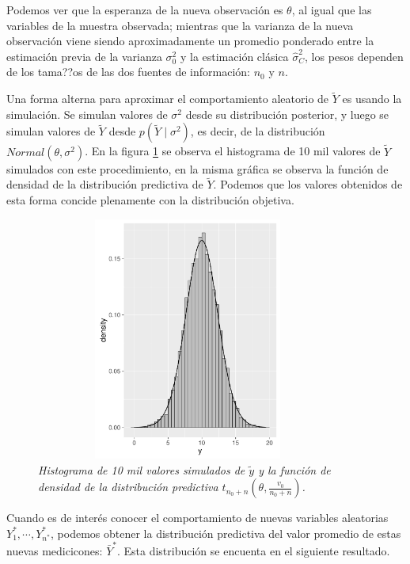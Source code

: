     Podemos ver que la esperanza de la nueva observaci\'on es $\theta$, al igual que las variables de la muestra observada; mientras que la varianza de la nueva observaci\'on viene siendo aproximadamente un promedio ponderado entre la estimaci\'on previa de la varianza $\sigma^2_0$ y la estimaci\'on cl\'asica $\hat{\sigma}^2_C$, los pesos dependen de los tama??os de las dos fuentes de informaci\'on: $n_0$ y $n$. 
    
    Una forma alterna para aproximar el comportamiento aleatorio de $\tilde{Y}$ es usando la simulaci\'on. Se simulan valores de $\sigma^2$ desde su distribuci\'on posterior, y luego se simulan valores de $\tilde{Y}$ desde $p(\tilde{Y}\mid\sigma^2)$, es decir, de la distribuci\'on $Normal(\theta,\sigma^2)$. En la figura \ref{Simu_Y_pred1} se observa el histograma de 10 mil valores de $\tilde{Y}$ simulados con este procedimiento, en la misma gr\'afica se observa la funci\'on de densidad de la distribuci\'on predictiva de $\tilde{Y}$. Podemos que los valores obtenidos de esta forma concide plenamente con la distribuci\'on objetiva.
    
    \begin{figure}[!htb]\label{Simu_Y_pred1}
    \centering
    \includegraphics[scale=0.5,width=10cm,height=8cm]{Simu_Y_pred.pdf}
    \caption{\emph{Histograma de 10 mil valores simulados de $\tilde{y}$ y la funci\'on de densidad de la distribuci\'on predictiva $t_{n_0+n}(\theta,\frac{v_0}{n_0+n})$.}}
    \end{figure}
    
    Cuando es de inter\'es conocer el comportamiento de nuevas variables aleatorias $Y_1^*,\cdots,Y_{n^*}^*$, podemos obtener la distribuci\'on predictiva del valor promedio de estas nuevas medicicones: $\bar{Y}^*$. Esta distribuci\'on se encuenta en el siguiente resultado.
    
